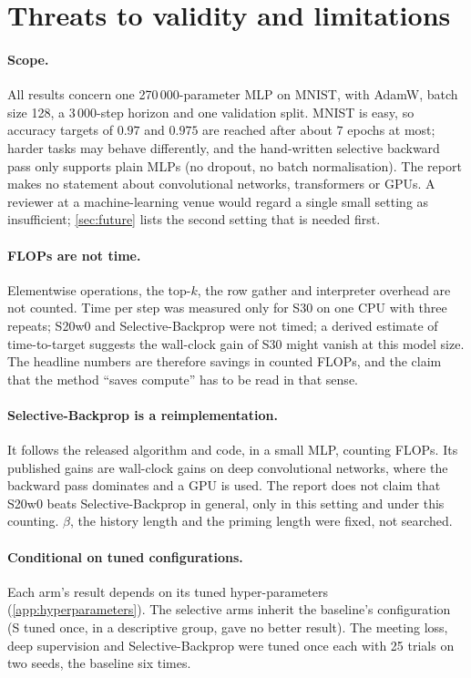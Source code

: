 \section{Threats to validity and limitations}\label{sec:limitations}
\paragraph{Scope.} All results concern one 270\,000-parameter MLP on MNIST, with AdamW, batch size 128, a 3\,000-step horizon and one validation split. MNIST is easy, so accuracy targets of $0.97$ and $0.975$ are reached after about $7$ epochs at most; harder tasks may behave differently, and the hand-written selective backward pass only supports plain MLPs (no dropout, no batch normalisation). The report makes no statement about convolutional networks, transformers or GPUs. A reviewer at a machine-learning venue would regard a single small setting as insufficient; \cref{sec:future} lists the second setting that is needed first.

\paragraph{FLOPs are not time.} Elementwise operations, the top-$k$, the row gather and interpreter overhead are not counted. Time per step was measured only for S30 on one CPU with three repeats; S20w0 and Selective-Backprop were not timed; a derived estimate of time-to-target suggests the wall-clock gain of S30 might vanish at this model size. The headline numbers are therefore savings in counted FLOPs, and the claim that the method ``saves compute'' has to be read in that sense.

\paragraph{Selective-Backprop is a reimplementation.} It follows the released algorithm and code, in a small MLP, counting FLOPs. Its published gains are wall-clock gains on deep convolutional networks, where the backward pass dominates and a GPU is used. The report does not claim that S20w0 beats Selective-Backprop in general, only in this setting and under this counting. $\beta$, the history length and the priming length were fixed, not searched.

\paragraph{Conditional on tuned configurations.} Each arm's result depends on its tuned hyper-parameters (\cref{app:hyperparameters}). The selective arms inherit the baseline's configuration (S tuned once, in a descriptive group, gave no better result). The meeting loss, deep supervision and Selective-Backprop were tuned once each with 25 trials on two seeds, the baseline six times.

